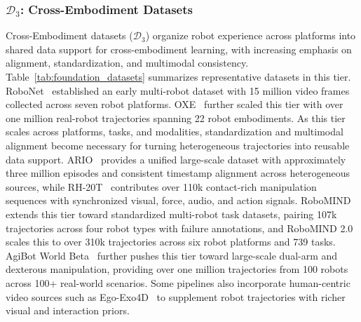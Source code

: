 \documentclass[acmsmall,screen,review]{acmart}
\begin{document}
\subsubsection{$\mathcal{D}_3$: Cross-Embodiment Datasets}\label{sec:foundation_datasets_narrative}

Cross-Embodiment datasets (\(\mathcal{D}_3\)) organize robot experience across platforms into shared data support for cross-embodiment learning, with increasing emphasis on alignment, standardization, and multimodal consistency.
Table~\ref{tab:foundation_datasets} summarizes representative datasets in this tier.
RoboNet~\cite{dasari2020robonet} established an early multi-robot dataset with 15 million video frames collected across seven robot platforms.
OXE~\cite{padalkar2023open} further scaled this tier with over one million real-robot trajectories spanning 22 robot embodiments.
As this tier scales across platforms, tasks, and modalities, standardization and multimodal alignment become necessary for turning heterogeneous trajectories into reusable data support.
ARIO~\cite{wang2024ario} provides a unified large-scale dataset with approximately three million episodes and consistent timestamp alignment across heterogeneous sources, while RH-20T~\cite{fang2023rh} contributes over 110k contact-rich manipulation sequences with synchronized visual, force, audio, and action signals.
RoboMIND~\cite{wu2025robomind} extends this tier toward standardized multi-robot task datasets, pairing 107k trajectories across four robot types with failure annotations, and RoboMIND 2.0~\cite{hou2026robomind20} scales this to over 310k trajectories across six robot platforms and 739 tasks.
AgiBot World Beta~\cite{agibot2025} further pushes this tier toward large-scale dual-arm and dexterous manipulation, providing over one million trajectories from 100 robots across 100+ real-world scenarios.
Some pipelines also incorporate human-centric video sources such as Ego-Exo4D~\cite{grauman2024egoexo4d} to supplement robot trajectories with richer visual and interaction priors.
\end{document}
